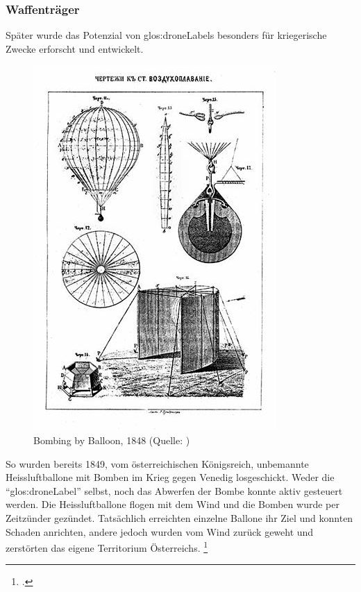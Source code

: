 \subsubsection{Waffenträger}
Später wurde das Potenzial von \glspl{glos:droneLabel} besonders für kriegerische Zwecke erforscht und entwickelt.
\begin{figure}
	\includegraphics[width=1.0\linewidth]{images/analysis/balloonbombs1849.jpg}
 	\caption[Bombing by Balloon, 1848]{Bombing by Balloon, 1848 (Quelle: )}
\end{figure}
So wurden bereits 1849, vom österreichischen Königsreich, unbemannte Heissluftballone mit Bomben im Krieg gegen Venedig losgeschickt.
Weder die "`\gls{glos:droneLabel}"' selbst, noch das Abwerfen der Bombe konnte aktiv gesteuert werden.
Die Heissluftballone flogen mit dem Wind und die Bomben wurde per Zeitzünder gezündet. Tatsächlich erreichten einzelne Ballone ihr Ziel und konnten Schaden anrichten, andere jedoch wurden vom Wind zurück geweht und zerstörten das eigene Territorium Österreichs. \footcite{Remote_Piloted_Aerial_Vehicles_2015-03-21}

